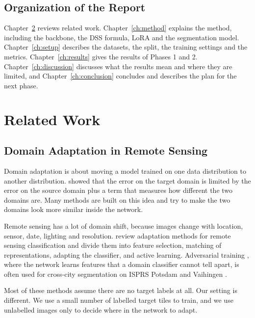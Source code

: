\documentclass[11pt,a4paper]{report}
\begin{document}
\section{Organization of the Report}

Chapter~\ref{ch:related} reviews related work. Chapter~\ref{ch:method} explains the method, including the backbone, the DSS formula, LoRA and the segmentation model. Chapter~\ref{ch:setup} describes the datasets, the split, the training settings and the metrics. Chapter~\ref{ch:results} gives the results of Phases 1 and 2. Chapter~\ref{ch:discussion} discusses what the results mean and where they are limited, and Chapter~\ref{ch:conclusion} concludes and describes the plan for the next phase.

\chapter{Related Work}
\label{ch:related}

\section{Domain Adaptation in Remote Sensing}

Domain adaptation is about moving a model trained on one data distribution to another distribution. \citet{bendavid2010theory} showed that the error on the target domain is limited by the error on the source domain plus a term that measures how different the two domains are. Many methods are built on this idea and try to make the two domains look more similar inside the network.

Remote sensing has a lot of domain shift, because images change with location, sensor, date, lighting and resolution. \citet{tuia2016domain} review adaptation methods for remote sensing classification and divide them into feature selection, matching of representations, adapting the classifier, and active learning. Adversarial training \cite{ganin2016domain}, where the network learns features that a domain classifier cannot tell apart, is often used for cross-city segmentation on ISPRS Potsdam and Vaihingen \cite{rottensteiner2012isprs}.

Most of these methods assume there are no target labels at all. Our setting is different. We use a small number of labelled target tiles to train, and we use unlabelled images only to decide where in the network to adapt.
\end{document}
